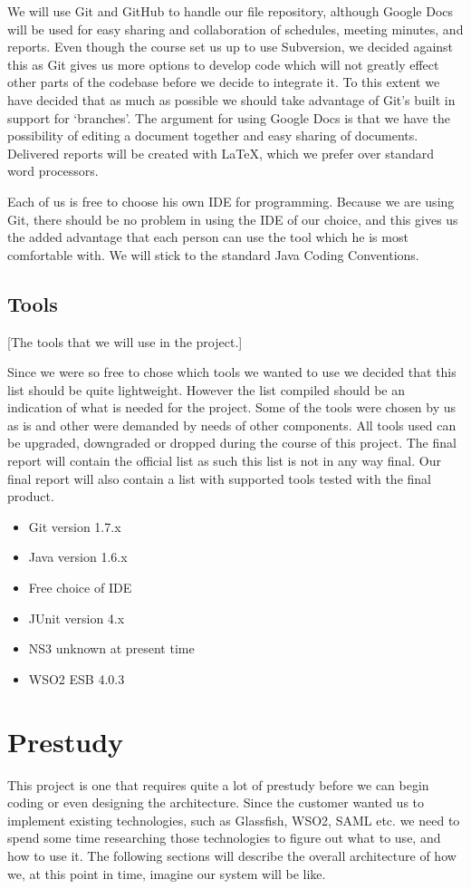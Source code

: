 \documentclass[12pt]{article}
\begin{document}
    We will use Git and GitHub to handle our file repository, although Google Docs will be used for easy sharing and collaboration of schedules, meeting minutes, and reports. Even though the course set us up to use Subversion, we decided against this as Git gives us more options to develop code which will not greatly effect other parts of the codebase before we decide to integrate it. To this extent we have decided that as much as possible we should take advantage of Git’s built in support for ‘branches’. The argument for using Google Docs is that we have the possibility of editing a document together and easy sharing of documents. Delivered reports will be created with LaTeX, which we prefer over standard word processors.

    Each of us is free to choose his own IDE for programming. Because we are using Git, there should be no problem in using the IDE of our choice, and this gives us the added advantage that each person can use the tool which he is most comfortable with. We will stick to the standard Java Coding Conventions.

    \subsection{Tools}\label{tools} [The tools that we will use in the project.]
    
    Since we were so free to chose which tools we wanted to use we decided that this list should be quite lightweight. However the list compiled should be an indication of what is needed for the project. Some of the tools were chosen by us as is and other were demanded by needs of other components. All tools used can be  upgraded, downgraded or dropped during the course of this project. The final report will contain the official list as such this list is not in any way final. Our final report will also contain a list with supported tools tested with the final product.
    \begin{itemize}
        \item Git version 1.7.x
        \item Java version 1.6.x
        \item Free choice of IDE
        \item JUnit version 4.x
        \item NS3 unknown at present time
        \item WSO2 ESB 4.0.3
    \end{itemize}
    
\section{Prestudy}\label{prestudy} This project is one that requires quite a lot of prestudy before we can begin coding or even designing the architecture. Since the customer wanted us to implement existing technologies, such as Glassfish, WSO2, SAML etc. we need to spend some time researching those technologies to figure out what to use, and how to use it. The following sections will describe the overall architecture of how we, at this point in time, imagine our system will be like. 
\end{document}
